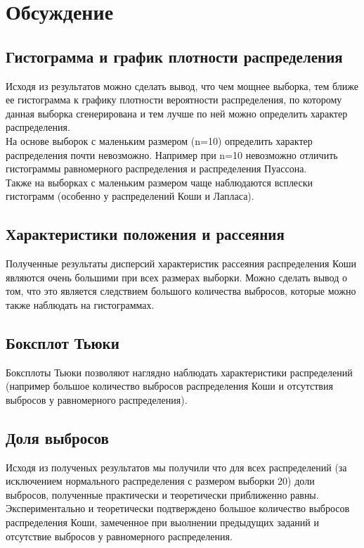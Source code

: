 \section{Обсуждение}

\subsection{Гистограмма и график плотности распределения}

Исходя из результатов можно сделать вывод, что чем мощнее выборка, тем ближе ее гистограмма к графику плотности вероятности распределения, по которому данная выборка сгенерирована и тем лучше по ней можно определить характер распределения. \\
На основе выборок с маленьким размером (n=10) определить характер распределения почти невозможно. Например при n=10 невозможно отличить гистограммы равномерного распределения и распределения Пуассона. \\
Также на выборках с маленьким размером чаще наблюдаются всплески гистограмм (особенно у распределений Коши и Лапласа). 

\subsection{Характеристики положения и рассеяния}

Полученные результаты дисперсий характеристик рассеяния распределения Коши являются очень большими при всех размерах выборки. Можно сделать вывод о том, что это является следствием большого количества выбросов, которые можно также наблюдать на гистограммах. 

\subsection{Боксплот Тьюки}

Боксплоты Тьюки позволяют наглядно наблюдать характеристики распределений (например большое количество выбросов распределения Коши и отсутствия выбросов у равномерного распределения).

\subsection{Доля выбросов}

Исходя из полученых результатов мы получили что для всех распределений (за исключением нормального распределения с размером выборки 20) доли выбросов, полученные практически и теоретически приближенно равны. \\
Экспериментально и теоретически подтверждено большое количество выбросов распределения Коши, замеченное при выолнении предыдущих заданий и отсутствие выбросов у равномерного распределения.


